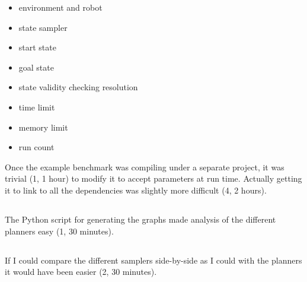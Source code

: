 \documentclass[twocolumn]{article}
\begin{document}
\begin{itemize}
\item environment and robot
\item state sampler
\item start state
\item goal state
\item state validity checking resolution
\item time limit
\item memory limit
\item run count
\end{itemize}

Once the example benchmark was compiling under a separate project, it was trivial (1, 1 hour) to modify it to accept parameters at run time. Actually getting it to link to all the dependencies was slightly more difficult (4, 2 hours).

\subsection {}

The Python script for generating the graphs made analysis of the different planners easy (1, 30 minutes).

\subsection {}

If I could compare the different samplers side-by-side as I could with the planners it would have been easier (2, 30 minutes).
\end{document}
